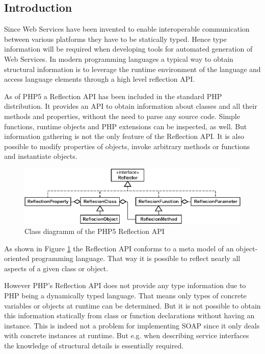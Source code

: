 \documentclass[10pt,final,a4paper,oneside]{article}
\begin{document}
\subsection{Introduction}
Since Web Services have been invented
to enable interoperable communication between
various platforms they have to be statically typed.
Hence type information will be required when
developing tools for automated generation of Web Services.
In modern programming languages
a typical way to obtain structural information
is to leverage the runtime environment of the language
and access language elements through a high level reflection API.

As of PHP5 a Reflection API has been included
in the standard PHP distribution.
It provides an API to obtain information about classes
and all their methods and properties,
without the need to parse any source code.
Simple functions, runtime objects and PHP extensions
can be inspected, as well.
But information gathering is not the
only feature of the Reflection API.
It is also possible to modify properties of objects,
invoke arbitrary methods or functions and
instantiate objects.

\begin{figure}[htbp]
	\centering
		\includegraphics[width=1.00\textwidth]{figures/php5-reflection-api.eps}
	\caption{Class diagramm of the  PHP5 Reflection API}
	\label{fig:php5-reflection-api}
\end{figure}

As shown in Figure \ref{fig:php5-reflection-api}
the Reflection API conforms to a meta model
of an object-oriented programming language.
That way it is possible to reflect
nearly all aspects of a given class or object.

However PHP's Reflection API does not provide any type information
due to PHP being a dynamically typed language.
That means only types of concrete variables or objects
at runtime can be determined.
But it is not possible to obtain this information statically from
class or function declarations without having an instance.
This is indeed not a problem for implementing SOAP
since it only deals with concrete instances at runtime.
But e.g. when describing service interfaces
the knowledge of structural details is essentially required.
\end{document}

